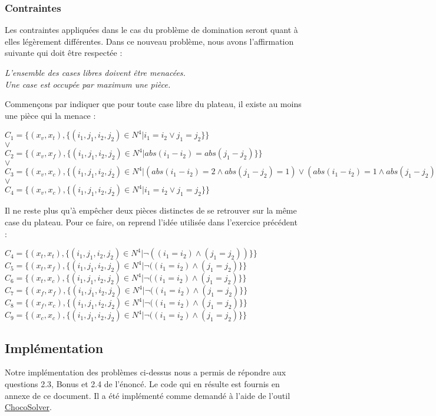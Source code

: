 \documentclass[a4paper]{article}
\begin{document}
\subsubsection{Contraintes}
Les contraintes appliquées dans le cas du problème de domination seront quant à elles légèrement différentes. Dans ce nouveau problème, nous avons l'affirmation suivante qui doit être respectée :
\begin{center}
\textit{L'ensemble des cases libres doivent être menacées.} \vspace{0.1cm} \\
\textit{Une case est occupée par maximum une pièce.}
\end{center}
Commençons par indiquer que pour toute case libre du plateau, il existe au moins une pièce qui la menace : 
\begin{center}
$C_1 = \{ (x_v,x_t), \{ (i_1,j_1,i_2,j_2) \in N^4 | i_1 = i_2 \vee j_1 = j_2 \} \}$ \\
$\vee$ \\
$C_2 = \{ (x_v,x_f), \{ (i_1,j_1,i_2,j_2) \in N^4 | abs(i_1 - i_2) = abs(j_1 - j_2) \} \}$ \\
$\vee$ \\
$C_3 = \{ (x_v,x_c), \{ (i_1,j_1,i_2,j_2) \in N^4 | (abs(i_1 - i_2) = 2 \wedge abs(j_1 - j_2) = 1) \vee (abs(i_1 - i_2) = 1 \wedge abs(j_1 - j_2)) = 2 \} \}$ \\
$\vee$ \\
$C_4 = \{ (x_v,x_c), \{ (i_1,j_1,i_2,j_2) \in N^4 | i_1 = i_2 \vee j_1 = j_2 \} \}$
\end{center}
Il ne reste plus qu'à empêcher deux pièces distinctes de se retrouver sur la même case du plateau. Pour ce faire, on reprend l'idée utilisée dans l'exercice précédent : 
\begin{center}
$C_4 = \{ (x_t,x_t), \{ (i_1,j_1,i_2,j_2) \in N^4 | \neg((i_1 = i_2) \wedge (j_1 = j_2)) \} \}$
$C_5 = \{ (x_t,x_f), \{ (i_1,j_1,i_2,j_2) \in N^4 | \neg((i_1 = i_2) \wedge (j_1 = j_2) \} \}$
$C_6 = \{ (x_t,x_c), \{ (i_1,j_1,i_2,j_2) \in N^4 | \neg((i_1 = i_2) \wedge (j_1 = j_2)\} \}$
$C_7 = \{ (x_f,x_f), \{ (i_1,j_1,i_2,j_2) \in N^4 | \neg((i_1 = i_2) \wedge (j_1 = j_2)\} \}$
$C_8 = \{ (x_f,x_c), \{ (i_1,j_1,i_2,j_2) \in N^4 | \neg((i_1 = i_2) \wedge (j_1 = j_2)\} \}$
$C_9 = \{ (x_c,x_c), \{ (i_1,j_1,i_2,j_2) \in N^4 | \neg((i_1 = i_2) \wedge (j_1 = j_2)\} \}$
\end{center}

\subsection{Implémentation}
Notre implémentation des problèmes ci-dessus nous a permis de répondre aux questions 2.3, Bonus et 2.4 de l'énoncé. Le code qui en résulte est fournis en annexe de ce document. Il a été implémenté comme demandé à l'aide de l'outil \href{http://www.choco-solver.org/}{ChocoSolver}.
\end{document}
